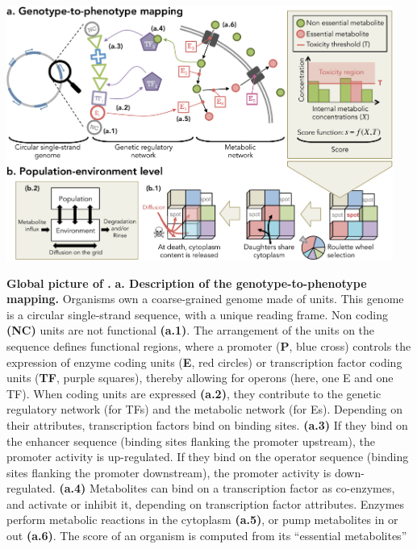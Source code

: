 \begin{figurehere}
\centering 
\includegraphics[width=0.95\textwidth]{figures/general_algorithm.pdf}
\caption[Global picture of {\packageName}.]{\small{\textbf{Global picture of {\packageName}.} \textbf{a. Description of the genotype-to-phenotype mapping.} Organisms own a coarse-grained genome made of units. This genome is a circular single-strand sequence, with a unique reading frame. Non coding \textbf{(NC)} units are not functional \textbf{(a.1)}. The arrangement of the units on the sequence defines functional regions, where a promoter (\textbf{P}, blue cross) controls the expression of enzyme coding units (\textbf{E}, red circles) or transcription factor coding units (\textbf{TF}, purple squares), thereby allowing for operons (here, one E and one TF). When coding units are expressed \textbf{(a.2)}, they contribute to the genetic regulatory network (for TFs) and the metabolic network (for Es).
Depending on their attributes, transcription factors bind on binding sites. \textbf{(a.3)} If they bind on the enhancer sequence (binding sites flanking the promoter upstream), the promoter activity is up-regulated. If they bind on the operator sequence (binding sites flanking the promoter downstream), the promoter activity is down-regulated. \textbf{(a.4)} Metabolites can bind on a transcription factor as co-enzymes, and activate or inhibit it, depending on transcription factor attributes.
Enzymes perform metabolic reactions in the cytoplasm \textbf{(a.5)}, or pump metabolites in or out \textbf{(a.6)}. The score of an organism is computed from its ``essential metabolites''
}}
\end{figurehere}
